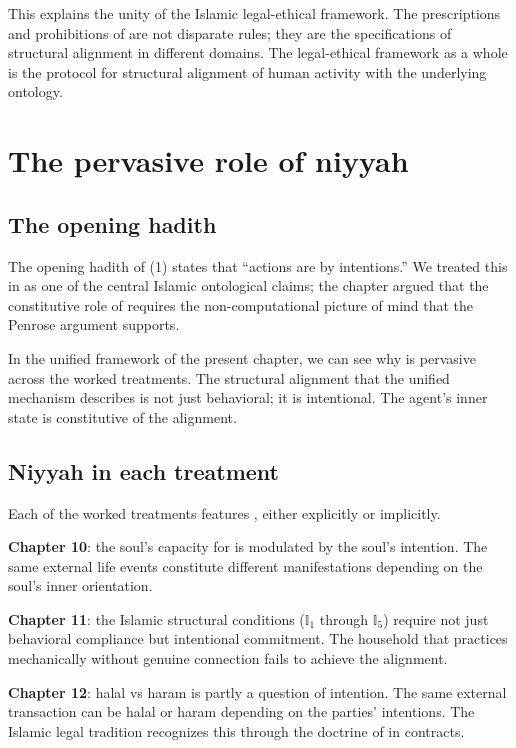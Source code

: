 This explains the unity of the Islamic legal-ethical framework.
The prescriptions and prohibitions of  are not
disparate rules; they are the specifications of structural
alignment in different domains. The legal-ethical framework as a
whole is the protocol for structural alignment of human activity
with the underlying ontology.

\section{The pervasive role of niyyah}
\label{sec:unified-niyyah}

\subsection{The opening hadith}

The opening hadith of  (1) states that
``actions are by intentions.'' We treated this in
 as one of the central Islamic
ontological claims; the chapter argued that the constitutive role
of  requires the non-computational picture of mind
that the Penrose argument supports.

In the unified framework of the present chapter, we can see why
 is pervasive across the worked treatments. The
structural alignment that the unified mechanism describes is
not just behavioral; it is intentional. The agent's inner state is
constitutive of the alignment.

\subsection{Niyyah in each treatment}

Each of the worked treatments features , either
explicitly or implicitly.

\textbf{Chapter 10}: the soul's capacity for  is
modulated by the soul's intention. The same external life events
constitute different manifestations depending on the soul's
inner orientation.

\textbf{Chapter 11}: the Islamic structural conditions
($\mathbb{I}_1$ through $\mathbb{I}_5$) require not just behavioral
compliance but intentional commitment. The household that practices
 mechanically without genuine connection
fails to achieve the alignment.

\textbf{Chapter 12}: halal vs haram is partly a question of
intention. The same external transaction can be halal or haram
depending on the parties' intentions. The Islamic legal tradition
recognizes this through the doctrine of  in
contracts.

